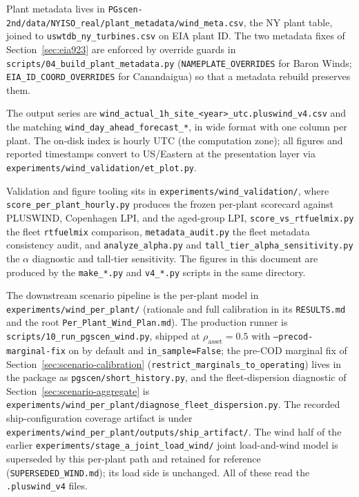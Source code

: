 \documentclass[11pt]{article}
\newcommand{\code}[1]{\texttt{\small #1}}
\begin{document}
Plant metadata lives in
\code{PGscen-2nd/data/NYISO\_real/plant\_metadata/wind\_meta.csv}, the NY
plant table, joined to \code{uswtdb\_ny\_turbines.csv} on EIA plant ID.
The two metadata fixes of Section~\ref{sec:eia923} are enforced by
override guards in \code{scripts/04\_build\_plant\_metadata.py}
(\code{NAMEPLATE\_OVERRIDES} for Baron Winds; \code{EIA\_ID\_COORD\_OVERRIDES}
for Canandaigua) so that a metadata rebuild preserves them.

The output series are
\code{wind\_actual\_1h\_site\_<year>\_utc.pluswind\_v4.csv} and the
matching \code{wind\_day\_ahead\_forecast\_*}, in wide format with one
column per plant. The on-disk index is hourly UTC (the computation
zone); all figures and reported timestamps convert to US/Eastern at the
presentation layer via \code{experiments/wind\_validation/et\_plot.py}.

Validation and figure tooling sits in
\code{experiments/wind\_validation/}, where
\code{score\_per\_plant\_hourly.py} produces
the frozen per-plant scorecard against PLUSWIND, Copenhagen LPI, and the
aged-group LPI, \code{score\_vs\_rtfuelmix.py} the fleet \code{rtfuelmix}
comparison, \code{metadata\_audit.py} the fleet metadata consistency
audit, and \code{analyze\_alpha.py} and
\code{tall\_tier\_alpha\_sensitivity.py}
the $\alpha$ diagnostic and tall-tier sensitivity. The figures in this
document are produced by the \code{make\_*.py} and \code{v4\_*.py}
scripts in the same directory.

The downstream scenario pipeline is the per-plant model in
\code{experiments/wind\_per\_plant/} (rationale and full calibration in
its \code{RESULTS.md} and the root \code{Per\_Plant\_Wind\_Plan.md}). The
production runner is \code{scripts/10\_run\_pgscen\_wind.py}, shipped at
$\rho_{\mathrm{asset}}=0.5$ with \code{--precod-marginal-fix} on by default
and \code{in\_sample=False}; the pre-COD marginal fix of
Section~\ref{sec:scenario-calibration}
(\code{restrict\_marginals\_to\_operating}) lives in the package as
\code{pgscen/short\_history.py}, and the fleet-dispersion diagnostic of
Section~\ref{sec:scenario-aggregate} is
\code{experiments/wind\_per\_plant/diagnose\_fleet\_dispersion.py}. The
recorded ship-configuration coverage artifact is under
\code{experiments/wind\_per\_plant/outputs/ship\_artifact/}. The wind half
of the earlier \code{experiments/stage\_a\_joint\_load\_wind/} joint
load-and-wind model is superseded by this per-plant path and retained for
reference (\code{SUPERSEDED\_WIND.md}); its load side is unchanged. All of
these read the \code{.pluswind\_v4} files.
\end{document}
